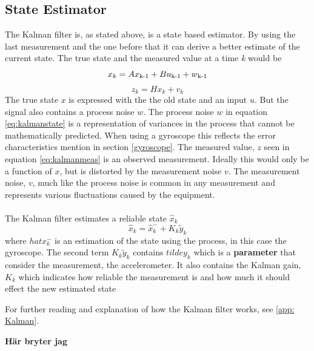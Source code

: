 \documentclass[a4paper,11pt]{kth-mag}
\begin{document}
\subsection{State Estimator}
The Kalman filter is, as stated above, is a state based estimator. By using the last measurement and the one before that it can derive a better estimate of the current state. The true state and the measured value at a time \textit{k} would be
\begin{equation}\label{eq:kalmanstate}
x_k = Ax\textsubscript{k-1}+Bu\textsubscript{k-1}+w\textsubscript{k-1}
\end{equation}
\begin{equation} \label{eq:kalmanmeas}
z_k = Hx_k + v_k
\end{equation}
The true state $x$ is expressed with the the old state and an input $u$. But the signal also contains a process noise $w$. The process noise $w$ in equation \eqref{eq:kalmanstate} is a representation of variances in the process that cannot be mathematically predicted. When using a gyroscope this reflects the error characteristics mention in section \ref{gyroscope}. 
The measured value, $z$ seen in equation \eqref{eq:kalmanmeas} is an observed measurement. Ideally this would only be a function of $x$, but is distorted by the measurement noise $v$.
The measurement noise, $v$, much like the process noise is common in any measurement and represents various fluctuations caused by the equipment.
\\ \\
The Kalman filter estimates a reliable state $\hat{x}_k$
\begin{equation}
\hat{x}_k = \hat{x}^-_k + K_k\tilde{y}_k
\end{equation}
where $hat{x}^-_k$ is an estimation of the state using the process, in this case the gyroscope. The second term $K_k\tilde{y}_k$ contains $tilde{y}_k$ which is a \textbf{parameter} that consider the measurement, the accelerometer. It also contains the Kalman gain, $K_k$ which indicates how reliable the measurement is and how much it should effect the new estimated state

For further reading and explanation of how the Kalman filter works, see \ref{app: Kalman}.

\textbf{Här bryter jag}
\end{document}
